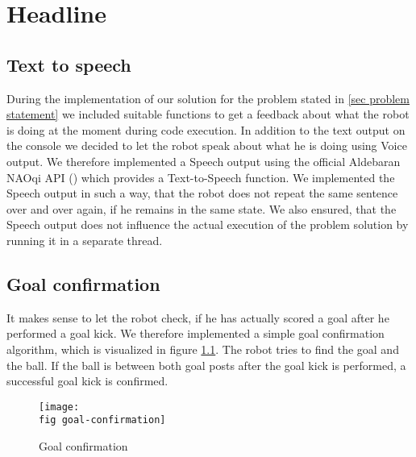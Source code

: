 \chapter{Headline}

\section{Text to speech}
During the implementation of our solution for the problem stated in \ref{sec problem statement} we included suitable functions to get a feedback about what the robot is doing at the moment during code execution. In addition to the text output on the console we decided to let the robot speak about what he is doing using Voice output. We therefore implemented a Speech output using the official Aldebaran NAOqi API (\cite{aldebarandocumentation}) which provides a Text-to-Speech function. We implemented the Speech output in such a way, that the robot does not repeat the same sentence over and over again, if he remains in the same state. We also ensured, that the Speech output does not influence the actual execution of the problem solution by running it in a separate thread.

\section{Goal confirmation}
It makes sense to let the robot check, if he has actually scored a goal after he performed a goal kick. 
We therefore implemented a simple goal confirmation algorithm, which is visualized in figure \ref{j figure goal confirmation}. The robot tries to find the goal and the ball. If the ball is between both goal posts after the goal kick is performed, a successful goal kick is confirmed. 

\begin{figure}[ht]
	\texttt{[image: \\fig goal-confirmation]}
	\caption{Goal confirmation}
	\label{j figure goal confirmation}
\end{figure}
